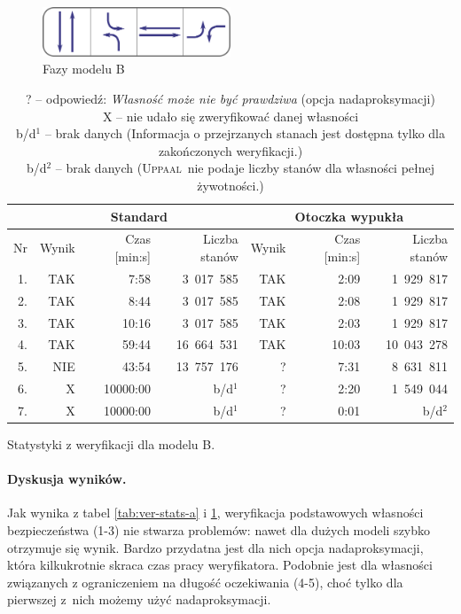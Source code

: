 \documentclass{pracamgr}
\newcommand{\upp}{\textsc{Uppaal}}
\theoremstyle{plain}
\begin{document}
\begin{figure}
  \centering
  \includegraphics[width=0.5\textwidth]{img/ver-b-cycle}
  \caption{Fazy modelu B}
  \label{img:ver-phases-b}
\end{figure}
\begin{table}[ht]
  \centering
  \begin{tabular}{|r||r|r|r||r|r|r||}
    \hline
    & \multicolumn{3}{c||}{\bf Standard} & \multicolumn{3}{c||}{\bf
      Otoczka wypukła} \\ \hline
    Nr   & Wynik & Czas [min:s] & Liczba stanów & Wynik & Czas [min:s] &
    Liczba stanów\\ \hline
    1. & TAK &  7:58 & 3~017~585  & TAK  & 2:09  &  1~929~817 \\
    2. & TAK &  8:44 & 3~017~585  & TAK  & 2:08  &  1~929~817 \\
    3. & TAK & 10:16 & 3~017~585  & TAK  & 2:03  &  1~929~817 \\
    4. & TAK & 59:44 & 16~664~531 & TAK  & 10:03 & 10~043~278 \\
    5. & NIE & 43:54 & 13~757~176 & ?    & 7:31  &  8~631~811 \\
    6. & X  & 10000:00 & b/d$^1$           & ?    & 2:20  &  1~549~044 \\
    7. & X  & 10000:00 & b/d$^1$         & ?    & 0:01  &       b/d$^2$ 
    \\\hline
  \end{tabular}
  \caption{Statystyki z weryfikacji dla modelu B.}
  \caption*{\footnotesize ? -- odpowiedź: \emph{Własność może nie być
      prawdziwa} (opcja nadaproksymacji)\\
            X -- nie udało się zweryfikować danej własności\\
    b/d$^1$ -- brak danych (Informacja o przejrzanych stanach jest
    dostępna tylko dla zakończonych weryfikacji.)\\
    b/d$^2$ -- brak danych (\upp\ nie podaje liczby stanów dla
    własności pełnej żywotności.)
  }
  \label{tab:ver-stats-b}
\end{table}

\paragraph{Dyskusja wyników.}
Jak wynika z tabel \ref{tab:ver-stats-a} i \ref{tab:ver-stats-b},
weryfikacja podstawowych własności bezpieczeństwa (1-3) nie stwarza
problemów: nawet dla dużych modeli szybko otrzymuje się
wynik. Bardzo przydatna jest dla nich opcja nadaproksymacji, która
kilkukrotnie skraca czas pracy weryfikatora. Podobnie jest dla
własności związanych z ograniczeniem na długość oczekiwania (4-5),
choć tylko dla pierwszej z~nich możemy użyć nadaproksymacji.
\end{document}
